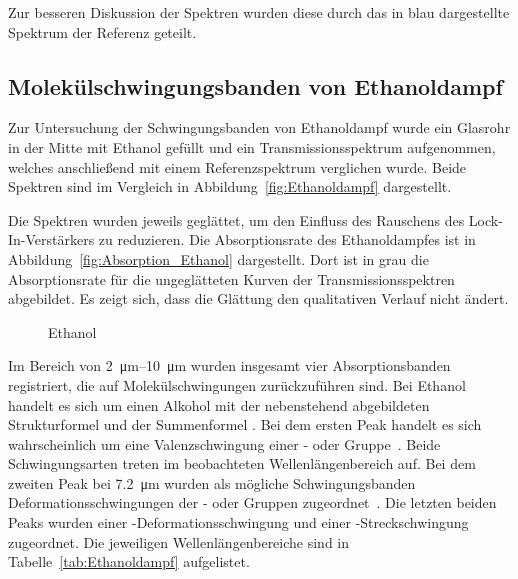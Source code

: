 \documentclass[a4paper,twoside,final]{article}
\begin{document}


Zur besseren Diskussion der Spektren wurden diese durch das in blau dargestellte Spektrum der Referenz geteilt.



\subsection{Molekülschwingungsbanden von Ethanoldampf}
Zur Untersuchung der Schwingungsbanden von Ethanoldampf wurde ein Glasrohr in der Mitte mit Ethanol gefüllt und ein Transmissionsspektrum aufgenommen, welches anschließend mit einem Referenzspektrum verglichen wurde. Beide Spektren sind im Vergleich in Abbildung~\ref{fig:Ethanoldampf} dargestellt.



Die Spektren wurden jeweils geglättet, um den Einfluss des Rauschens des Lock-In-Verstärkers zu reduzieren. Die Absorptionsrate des Ethanoldampfes ist in Abbildung~\ref{fig:Absorption_Ethanol} dargestellt. Dort ist in grau die Absorptionsrate für die ungeglätteten Kurven der Transmissionsspektren abgebildet. Es zeigt sich, dass die Glättung den qualitativen Verlauf nicht ändert.



\begin{figure}
  \centering
  \caption{Ethanol}
\end{figure}
Im Bereich von \SIrange{2}{10}{\micro\metre} wurden insgesamt vier Absorptionsbanden registriert, die auf Molekülschwingungen zurückzuführen sind. Bei Ethanol handelt es sich um einen Alkohol mit der nebenstehend abgebildeten Strukturformel und der Summenformel . Bei dem ersten Peak handelt es sich wahrscheinlich um eine Valenzschwingung einer - oder  Gruppe~\cite{Roempp}. Beide Schwingungsarten treten im beobachteten Wellenlängenbereich auf. Bei dem zweiten Peak bei \SI{7.2}{\micro\metre} wurden als mögliche Schwingungsbanden Deformationsschwingungen der - oder  Gruppen zugeordnet~\cite{Roempp}. Die letzten beiden Peaks wurden einer -Deformationsschwingung und einer -Streckschwingung zugeordnet. Die jeweiligen Wellenlängenbereiche sind in Tabelle~\ref{tab:Ethanoldampf} aufgelistet.
\end{document}
